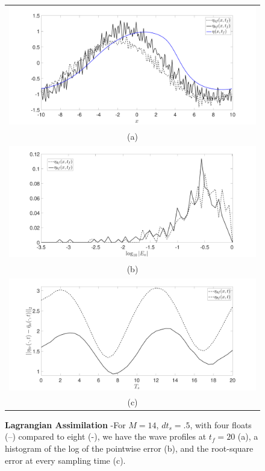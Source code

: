 \begin{figure}
	\centering
	\begin{tabular}{c}
		\includegraphics[width=.95\textwidth]{Images/wave_tf_20_sig_pt1_4_vs8floats_Mval_14} \\
		(a)\\
		\includegraphics[width=.95\textwidth]{Images/histogram_tf_20_sig_pt1_4_vs_8floats_Mval_14}\\
		(b)\\
		\includegraphics[width=.95\textwidth]{Images/rmserr_tf_20_sig_pt1_4_vs8floats_Mval_14}\\
		(c)
	\end{tabular}
	\caption{{\bf Lagrangian Assimilation} -For $M=14$, $dt_{s}=.5$, with four floats (--) compared to eight (-), we have the wave profiles at $t_{f}=20$ (a), a histogram of the log of the pointwise error (b), and the root-square error at every sampling time (c).} 
	\label{fig:Mval_14_lagran}
\end{figure}
